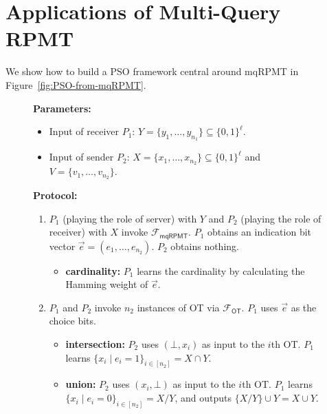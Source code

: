 \documentclass[a4paper,10pt]{article}
\newcommand{\FuncOT}{\mathcal{F}_\mathsf{OT}}
\newcommand{\FuncMQRPMT}{\mathcal{F}_\mathsf{mqRPMT}}
\begin{document}
\section{Applications of Multi-Query RPMT}
We show how to build a PSO framework central around mqRPMT in Figure~\ref{fig:PSO-from-mqRPMT}.
\begin{figure}[!hbtp]
\begin{framed}
\begin{minipage}[center]{\textwidth}
\begin{trivlist}
\item \textbf{Parameters:} 
\begin{itemize}
    \item Input of receiver $P_1$: $Y = \{y_1, \dots, y_{n_1}\} \subseteq \{0,1\}^\ell$.

    \item Input of sender $P_2$: $X = \{x_1, \dots, x_{n_2}\} \subseteq \{0,1\}^\ell$ 
        and $V = \{v_1, \dots, v_{n_2}\}$.
\end{itemize}

\item \textbf{Protocol:}

\begin{enumerate}
\item $P_1$ (playing the role of server) with $Y$ and $P_2$ (playing the role of receiver) with $X$
    invoke $\FuncMQRPMT$. $P_1$ obtains an indication bit vector $\vec{e} = (e_1, \dots, e_{n_2})$. 
    $P_2$ obtains nothing.  

    \begin{itemize}
        \item \textbf{cardinality:} $P_1$ learns the cardinality by calculating the Hamming weight of $\vec{e}$. 
    \end{itemize}

\item $P_1$ and $P_2$ invoke $n_2$ instances of OT via $\FuncOT$. 
    $P_1$ uses $\vec{e}$ as the choice bits. 


\begin{itemize}
    \item \textbf{intersection:} $P_2$ uses $(\bot, x_i)$ as input to the $i$th OT. 
        $P_1$ learns $\{x_i \mid e_i = 1\}_{i \in [n_2]} = X \cap Y$. 

    \item \textbf{union:} $P_2$ uses $(x_i, \bot)$ as input to the $i$th OT. 
        $P_1$ learns $\{x_i \mid e_i = 0\}_{i \in [n_2]} = X \slash Y$, and outputs $\{X \slash Y\} \cup Y = X \cup Y$. 


\end{itemize}
\end{enumerate}
\end{trivlist}
\end{minipage}
\end{framed}
\end{figure}
\end{document}
